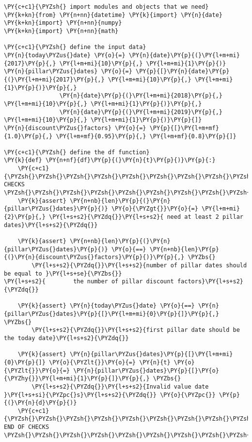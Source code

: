 \begin{Answer}
\begin{tcolorbox}[size=fbox, boxrule=1pt, colback=cellbackground, colframe=cellborder]
\begin{Verbatim}[commandchars=\\\{\}]
\PY{c+c1}{\PYZsh{} import modules and objects that we need}
\PY{k+kn}{from} \PY{n+nn}{datetime} \PY{k}{import} \PY{n}{date}
\PY{k+kn}{import} \PY{n+nn}{numpy}
\PY{k+kn}{import} \PY{n+nn}{math}

\PY{c+c1}{\PYZsh{} define the input data}
\PY{n}{today\PYZus{}date} \PY{o}{=} \PY{n}{date}\PY{p}{(}\PY{l+m+mi}{2017}\PY{p}{,} \PY{l+m+mi}{10}\PY{p}{,} \PY{l+m+mi}{1}\PY{p}{)}
\PY{n}{pillar\PYZus{}dates} \PY{o}{=} \PY{p}{[}\PY{n}{date}\PY{p}{(}\PY{l+m+mi}{2017}\PY{p}{,} \PY{l+m+mi}{10}\PY{p}{,} \PY{l+m+mi}{1}\PY{p}{)}\PY{p}{,} 
                \PY{n}{date}\PY{p}{(}\PY{l+m+mi}{2018}\PY{p}{,} \PY{l+m+mi}{10}\PY{p}{,} \PY{l+m+mi}{1}\PY{p}{)}\PY{p}{,} 
                \PY{n}{date}\PY{p}{(}\PY{l+m+mi}{2019}\PY{p}{,} \PY{l+m+mi}{10}\PY{p}{,} \PY{l+m+mi}{1}\PY{p}{)}\PY{p}{]}
\PY{n}{discount\PYZus{}factors} \PY{o}{=} \PY{p}{[}\PY{l+m+mf}{1.0}\PY{p}{,} \PY{l+m+mf}{0.95}\PY{p}{,} \PY{l+m+mf}{0.8}\PY{p}{]}

\PY{c+c1}{\PYZsh{} define the df function}
\PY{k}{def} \PY{n+nf}{df}\PY{p}{(}\PY{n}{t}\PY{p}{)}\PY{p}{:}
    \PY{c+c1}{\PYZsh{}\PYZsh{}\PYZsh{}\PYZsh{}\PYZsh{}\PYZsh{}\PYZsh{}\PYZsh{}\PYZsh{}\PYZsh{}\PYZsh{}\PYZsh{}\PYZsh{}\PYZsh{} CHECKS \PYZsh{}\PYZsh{}\PYZsh{}\PYZsh{}\PYZsh{}\PYZsh{}\PYZsh{}\PYZsh{}\PYZsh{}\PYZsh{}\PYZsh{}\PYZsh{}\PYZsh{}\PYZsh{}\PYZsh{}\PYZsh{}}
    \PY{k}{assert} \PY{n+nb}{len}\PY{p}{(}\PY{n}{pillar\PYZus{}dates}\PY{p}{)} \PY{o}{\PYZgt{}}\PY{o}{=} \PY{l+m+mi}{2}\PY{p}{,} \PY{l+s+s2}{\PYZdq{}}\PY{l+s+s2}{ need at least 2 pillar dates}\PY{l+s+s2}{\PYZdq{}}
    
    \PY{k}{assert} \PY{n+nb}{len}\PY{p}{(}\PY{n}{pillar\PYZus{}dates}\PY{p}{)} \PY{o}{==} \PY{n+nb}{len}\PY{p}{(}\PY{n}{discount\PYZus{}factors}\PY{p}{)}\PY{p}{,} \PYZbs{}
        \PY{l+s+s2}{\PYZdq{}}\PY{l+s+s2}{number of pillar dates should be equal to }\PY{l+s+se}{\PYZbs{}}
\PY{l+s+s2}{        the number of pillar discount factors}\PY{l+s+s2}{\PYZdq{}}
    
    \PY{k}{assert} \PY{n}{today\PYZus{}date} \PY{o}{==} \PY{n}{pillar\PYZus{}dates}\PY{p}{[}\PY{l+m+mi}{0}\PY{p}{]}\PY{p}{,} \PYZbs{}
        \PY{l+s+s2}{\PYZdq{}}\PY{l+s+s2}{first pillar date should be the today date}\PY{l+s+s2}{\PYZdq{}}
    
    \PY{k}{assert} \PY{n}{pillar\PYZus{}dates}\PY{p}{[}\PY{l+m+mi}{0}\PY{p}{]} \PY{o}{\PYZlt{}}\PY{o}{=} \PY{n}{t} \PY{o}{\PYZlt{}}\PY{o}{=} \PY{n}{pillar\PYZus{}dates}\PY{p}{[}\PY{o}{\PYZhy{}}\PY{l+m+mi}{1}\PY{p}{]}\PY{p}{,} \PYZbs{}
        \PY{l+s+s2}{\PYZdq{}}\PY{l+s+s2}{Invalid value date }\PY{l+s+si}{\PYZpc{}s}\PY{l+s+s2}{\PYZdq{}} \PY{o}{\PYZpc{}} \PY{p}{(}\PY{n}{d}\PY{p}{)}
    \PY{c+c1}{\PYZsh{}\PYZsh{}\PYZsh{}\PYZsh{}\PYZsh{}\PYZsh{}\PYZsh{}\PYZsh{}\PYZsh{}\PYZsh{}\PYZsh{}\PYZsh{}\PYZsh{}\PYZsh{} END OF CHECKS \PYZsh{}\PYZsh{}\PYZsh{}\PYZsh{}\PYZsh{}\PYZsh{}\PYZsh{}\PYZsh{}\PYZsh{}\PYZsh{}\PYZsh{}\PYZsh{}\PYZsh{}\PYZsh{}\PYZsh{}\PYZsh{}}
    

\end{Verbatim}
\end{tcolorbox}
\end{Answer}
